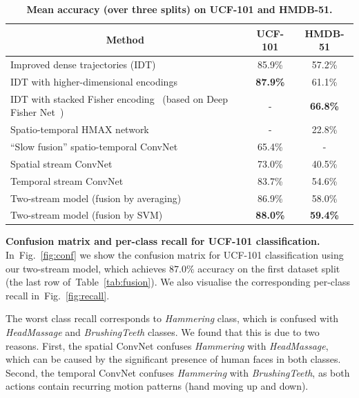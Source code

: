 \documentclass{article} %
\newcommand{\figref}[1]{Fig.~\ref{#1}}
\newcommand{\tblref}[1]{Table~\ref{#1}}
\begin{document}
\begin{table}[ht]
\small
\centering
\caption{\textbf{Mean accuracy (over three splits) on UCF-101 and HMDB-51.}
}
\begin{tabular}{|l|c|c|} \hline
\multicolumn{1}{|c|}{Method} & UCF-101 & HMDB-51 \\ \hline
Improved dense trajectories (IDT)~\cite{Wang13b,Wang13c} & 85.9\% & 57.2\% \\ \hline
IDT with higher-dimensional encodings~\cite{Peng14} & \textbf{87.9\%} & 61.1\% \\ \hline
IDT with stacked Fisher encoding~\cite{Peng14a} (based on Deep Fisher Net~\cite{Simonyan13b}) & - & \textbf{66.8\%} \\ \hline
Spatio-temporal HMAX network~\cite{Kuehne11,Jhuang07} & - & 22.8\% \\ \hline
``Slow fusion'' spatio-temporal ConvNet~\cite{Karpathy14} & 65.4\% & - \\ \hline\hline
Spatial stream ConvNet & 73.0\% & 40.5\% \\ \hline
Temporal stream ConvNet & 83.7\% & 54.6\% \\ \hline
Two-stream model (fusion by averaging) & 86.9\% & 58.0\% \\ \hline
Two-stream model (fusion by SVM) & \textbf{88.0\%} & \textbf{59.4\%} \\ \hline
\end{tabular}
\label{tab:comp_SOA}
\end{table}

\noindent\textbf{Confusion matrix and per-class recall for UCF-101 classification.}
In~\figref{fig:conf} we show the confusion matrix for UCF-101 classification using our two-stream model, which achieves $87.0\%$ accuracy on the first dataset split (the last row of~\tblref{tab:fusion}).
We also visualise the corresponding per-class recall in~\figref{fig:recall}.

The worst class recall corresponds to \emph{Hammering} class, which is confused with \emph{HeadMassage} and \emph{BrushingTeeth} classes.
We found that this is due to two reasons. First, the spatial ConvNet confuses \emph{Hammering} with \emph{HeadMassage}, which can be caused by
the significant presence of human faces in both classes. Second, the temporal ConvNet confuses \emph{Hammering} with \emph{BrushingTeeth}, as
both actions contain recurring motion patterns (hand moving up and down).
\end{document}
